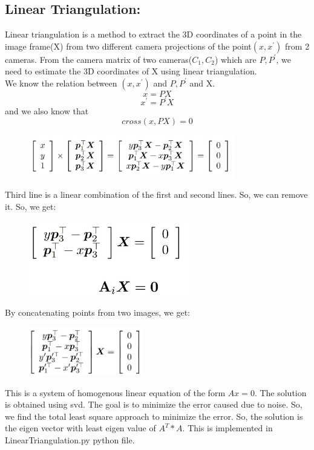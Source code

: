 \documentclass[12pt]{article}
\begin{document}
\subsection{Linear Triangulation:}
Linear triangulation is a method to extract the 3D coordinates of a point in the image frame(X) from two different camera projections of the point$(x,x^{'})$ from 2 cameras.  From the camera matrix of two cameras($C_1, C_2$) which are $P,P^{'}$, we need to estimate the 3D coordinates of X using linear triangulation. \\
We know the relation between $(x,x^{'})$ and $P,P^{'}$ and X.
\begin{equation}
	x = PX
\end{equation}
\begin{equation}
	x^{'} = P^{'}X
\end{equation}
and we also know that
\begin{equation}
	cross(x, PX)= 0 
\end{equation}
\begin{figure}[h]
    \centering
    \includegraphics[width=9cm]{formula}
\end{figure}
Third line is a linear combination of the first and second lines.  So, we can remove it. So, we get:
\begin{figure}[h]
    \centering
    \includegraphics[width=7cm]{formula1}
\end{figure}
By concatenating points from two images, we get:
\begin{figure}[h]
    \centering
    \includegraphics[width=5cm]{formula2}
\end{figure}
This is a system of homogenous linear equation of the form $Ax = 0$. The solution is obtained using svd. The goal is to minimize the error caused due to noise. So, we find the total least square approach to minimize the error. So, the solution is the eigen vector with least eigen value of $A^{T}*A$. This is implemented in LinearTriangulation.py python file.
\end{document}
